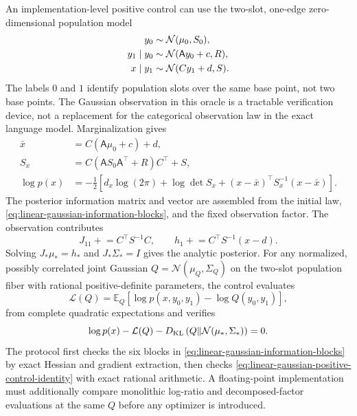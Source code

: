 An implementation-level positive control can use the two-slot, one-edge zero-dimensional population model
\begin{equation}
\begin{aligned}
y_0&\sim\mathcal N(\mu_0,S_0),\\
y_1\mid y_0&\sim\mathcal N(\mathsf A y_0+c,R),\\
x\mid y_1&\sim\mathcal N(Cy_1+d,S).
\end{aligned}
\label{eq:linear-gaussian-positive-control-model}
\end{equation}
The labels $0$ and $1$ identify population slots over the same base point, not two base points. The Gaussian observation in this oracle is a tractable verification device, not a replacement for the categorical observation law in the exact language model. Marginalization gives
\begin{equation}
\begin{aligned}
\bar x
&=C(\mathsf A\mu_0+c)+d,\\
S_x
&=C(\mathsf A S_0\mathsf A^\top+R)C^\top+S,\\
\log p(x)
&=-\frac12\left[
d_x\log(2\pi)+\log\det S_x
+(x-\bar x)^\top S_x^{-1}(x-\bar x)
\right].
\end{aligned}
\label{eq:linear-gaussian-positive-control-evidence}
\end{equation}
The posterior information matrix and vector are assembled from the initial law, \cref{eq:linear-gaussian-information-blocks}, and the fixed observation factor. The observation contributes
\begin{equation}
J_{11}\mathrel{+}=C^\top S^{-1}C,
\qquad
h_1\mathrel{+}=C^\top S^{-1}(x-d).
\label{eq:gaussian-observation-information-contribution}
\end{equation}
Solving $J_*\mu_*=h_*$ and $J_*\Sigma_*=I$ gives the analytic posterior. For any normalized, possibly correlated joint Gaussian $Q=\mathcal N(\mu_Q,\Sigma_Q)$ on the two-slot population fiber with rational positive-definite parameters, the control evaluates
\begin{equation}
\mathcal L(Q)
=\mathbb E_Q[\log p(x,y_0,y_1)-\log Q(y_0,y_1)],
\label{eq:linear-gaussian-positive-control-elbo}
\end{equation}
from complete quadratic expectations and verifies
\begin{equation}
\log p(x)-\mathcal L(Q)
-D_{\mathrm{KL}}\left(Q\middle\Vert
\mathcal N(\mu_*,\Sigma_*)\right)=0.
\label{eq:linear-gaussian-positive-control-identity}
\end{equation}
The protocol first checks the six blocks in \cref{eq:linear-gaussian-information-blocks} by exact Hessian and gradient extraction, then checks \cref{eq:linear-gaussian-positive-control-identity} with exact rational arithmetic. A floating-point implementation must additionally compare monolithic log-ratio and decomposed-factor evaluations at the same $Q$ before any optimizer is introduced.

